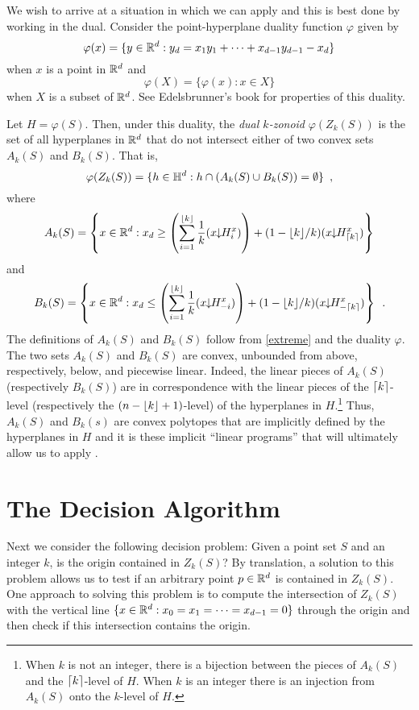 \documentclass[lotsofwhite]{patmorin}
\newcommand{\drop}{\!\!\downarrow\!\!}
\newcommand{\dual}{\varphi}
\begin{document}
We wish to arrive at a situation in which we can apply 
and this is best done by working in the dual.
Consider the point-hyperplane duality function
$\dual$ given by 
\[
    \dual(x)=\{y\in\R^d : y_d = x_1y_1 +\cdots +x_{d-1}y_{d-1} - x_d \}
\] 
when $x$ is a point in $\mathbb{R}^d$ and
\[
     \dual(X) = \{\dual(x) : x\in X\}
\]
when $X$ is a subset of $\mathbb{R}^d$.  See Edelsbrunner's book \cite{e97}
for properties of this duality. 

Let $H=\dual(S)$.  Then,
under this duality, the \emph{dual $k$-zonoid} $\dual(Z_k(S))$ is the set 
of all hyperplanes in $\mathbb{R}^d$
that do not intersect either of two convex sets $A_k(S)$ and $B_k(S)$.
That is,
\[
     \dual(Z_k(S)) = \{ h\in\Hy^d : h\cap(A_k(S)\cup B_k(S)) = \emptyset \} \enspace ,
\]
where
\begin{equation}
   A_k(S) = \left\{x\in\R^d: x_d \ge 
\left(\sum_{i=1}^{\floor{k}} \frac{1}{k}(x\drop H_i^x)\right) +
          (1-\lfloor k\rfloor/k)(x\drop H_{\ceil{k}}^x) \right\}  \eqlabel{ra}
\end{equation} 
and
\begin{equation}
   B_k(S) = \left\{x\in\R^d: x_d \le 
\left(\sum_{i=1}^{\floor{k}} \frac{1}{k}(x\drop H_{-i}^x)\right) +
          (1-\lfloor k\rfloor/k)(x\drop H_{-\ceil{k}}^x) \right\} \enspace .
\end{equation}
The definitions of $A_k(S)$ and $B_k(S)$ follow from \eqref{extreme}
and the duality $\dual$.  The two sets $A_k(S)$ and $B_k(S)$ are
convex, unbounded from above, respectively, below, and piecewise
linear.  Indeed, the linear pieces of $A_k(S)$ (respectively $B_k(S)$)
are in correspondence with the linear pieces of the
$\left\lceil k \right\rceil$-level (respectively the $(n-\left\lfloor k \right\rfloor+1)$-level) of the
hyperplanes in $H$.\footnote{When $k$ is not an integer, there is a
bijection between the pieces of $A_k(S)$ and the $\left\lceil k \right\rceil$-level of
$H$.  When $k$ is an integer there is an injection from $A_k(S)$ onto
the $k$-level of $H$.}  Thus, $A_k(S)$ and $B_k(s)$ are convex
polytopes that are implicitly defined by the hyperplanes in $H$ and it
is these implicit ``linear programs'' that will ultimately allow us to
apply .


\section{The Decision Algorithm}

Next we consider the following decision problem:  Given a point set
$S$ and an integer $k$, is the origin contained in $Z_k(S)$?  By
translation, a solution to this problem allows us to test if an
arbitrary point $p\in\mathbb{R}^d$ is contained in $Z_k(S)$. One approach to
solving this problem is to compute the intersection of $Z_k(S)$ with
the vertical line $\{x\in\mathbb{R}^d:x_0=x_1=\cdots=x_{d-1}=0\}$ through the origin
and then check if this intersection contains the origin.
\end{document}

